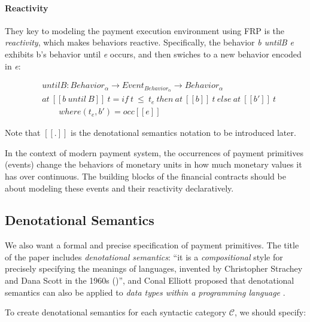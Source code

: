 \paragraph{Reactivity}

They key to modeling the payment execution environment using FRP is the \textit{reactivity}, which
makes behaviors reactive. Specifically, the behavior \textit{b untilB e} exhibits b's behavior
until \textit{e} occurs, and then swiches to a new behavior encoded in \textit{e}:

\begin{equation}
    \begin{split}
    &untilB : Behavior_{\alpha} \rightarrow Event_{Behavior_{\alpha}} \rightarrow Behavior_{\alpha} \\
    &at\ [\![b\ until\ B]\!]\ t = if\ t\ \leq\ t_{e}\ then\ at\ [\![b]\!]\ t\ else\ at\ [\![b']\!]\ t \\
    &\qquad where (t_e, b') = occ[\![e]\!]
    \end{split}
\end{equation}

Note that $[\![.]\!]$ is the denotational semantics notation to be introduced later.

In the context of modern payment system, the occurrences of payment primitives (events) change the
behaviors of monetary units in how much monetary values it has over continuous. The building blocks
of the financial contracts should be about modeling these events and their reactivity declaratively.

\subsection{Denotational Semantics}

We also want a formal and precise specification of payment primitives. The title of the paper
includes \textit{denotational semantics}: ``it is a \textit{compositional} style for precisely
specifying the meanings of languages, invented by Christopher Strachey and Dana Scott in the 1960s
(\cite{scott1971toward})'', and Conal Elliott proposed that denotational semantics can also be
applied to \textit{data types within a programming language}
.

To create denotational semantics for each syntactic category $\mathcal{C}$, we should specify:

